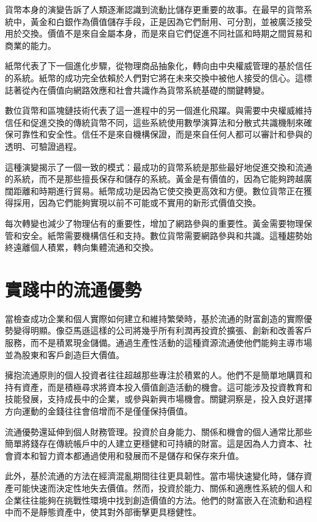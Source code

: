 \documentclass[
  Letterpaper,
]{scrbook}
\begin{document}
貨幣本身的演變告訴了人類逐漸認識到流動比儲存更重要的故事。在最早的貨幣系統中，黃金和白銀作為價值儲存手段，正是因為它們耐用、可分割，並被廣泛接受用於交換。價值不是來自金屬本身，而是來自它們促進不同社區和時期之間貿易和商業的能力。

紙幣代表了下一個進化步驟，從物理商品抽象化，轉向由中央權威管理的基於信任的系統。紙幣的成功完全依賴於人們對它將在未來交換中被他人接受的信心。這標誌著從內在價值向網路效應和社會共識作為貨幣系統基礎的關鍵轉變。

數位貨幣和區塊鏈技術代表了這一進程中的另一個進化飛躍。與需要中央權威維持信任和促進交換的傳統貨幣不同，這些系統使用數學演算法和分散式共識機制來確保可靠性和安全性。信任不是來自機構保證，而是來自任何人都可以審計和參與的透明、可驗證過程。

這種演變揭示了一個一致的模式：最成功的貨幣系統是那些最好地促進交換和流通的系統，而不是那些擅長保存和儲存的系統。黃金是有價值的，因為它能夠跨越廣闊距離和時期進行貿易。紙幣成功是因為它使交換更高效和方便。數位貨幣正在獲得採用，因為它們能夠實現以前不可能或不實用的新形式價值交換。

每次轉變也減少了物理佔有的重要性，增加了網路參與的重要性。黃金需要物理保管和安全。紙幣需要機構信任和支持。數位貨幣需要網路參與和共識。這種趨勢始終遠離個人積累，轉向集體流通和交換。

\section{實踐中的流通優勢}\label{ux5be6ux8e10ux4e2dux7684ux6d41ux901aux512aux52e2}

當檢查成功企業和個人實際如何建立和維持繁榮時，基於流通的財富創造的實際優勢變得明顯。像亞馬遜這樣的公司將幾乎所有利潤再投資於擴張、創新和改善客戶服務，而不是積累現金儲備。通過生產性活動的這種資源流通使他們能夠主導市場並為股東和客戶創造巨大價值。

擁抱流通原則的個人投資者往往超越那些專注於積累的人。他們不是簡單地購買和持有資產，而是積極尋求將資本投入價值創造活動的機會。這可能涉及投資教育和技能發展，支持成長中的企業，或參與新興市場機會。關鍵洞察是，投入良好選擇方向運動的金錢往往會倍增而不是僅僅保持價值。

流通優勢還延伸到個人財務管理。投資於自身能力、關係和機會的個人通常比那些簡單將錢存在傳統帳戶中的人建立更穩健和可持續的財富。這是因為人力資本、社會資本和智力資本都通過使用和發展而不是儲存和保存來升值。

此外，基於流通的方法在經濟混亂期間往往更具韌性。當市場快速變化時，儲存資產可能快速而決定性地失去價值。然而，投資於能力、關係和適應性系統的個人和企業往往能夠在挑戰性環境中找到創造價值的方法。他們的財富嵌入在流動和過程中而不是靜態資產中，使其對外部衝擊更具穩健性。
\end{document}
